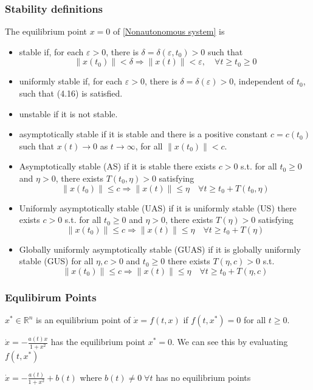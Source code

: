 \documentclass{article}
\begin{document}
\subsubsection{Stability definitions}
The equilibrium point $x=0$ of \ref{Nonautonomous system} is
\begin{itemize}
	\item stable if, for each $\varepsilon>0$, there is $\delta=\delta\left(\varepsilon,
		      t_0\right)>0$ such that $$ \left\|x\left(t_0\right)\right\|<\delta
		      \Rightarrow\|x(t)\|<\varepsilon, \quad \forall t \geq t_0 \geq 0 $$
	\item uniformly stable if, for each $\varepsilon>0$, there is
	      $\delta=\delta(\varepsilon)>0$, independent of $t_0$, such that (4.16) is
	      satisfied.
	\item unstable if it is not stable.
	\item asymptotically stable if it is stable and there is a positive constant
	      $c=c\left(t_0\right)$ such that $x(t) \rightarrow 0$ as $t \rightarrow \infty$,
	      for all $\left\|x\left(t_0\right)\right\|<c$.
	\item Asymptotically stable (AS) if \subitem it is stable \subitem there exists $c>0$
	      s.t. for all $t_0 \geq 0$ and $\eta>0$, there exists $T\left(t_0,
		      \eta\right)>0$ satisfying $$ \left\|x\left(t_0\right)\right\| \leq c
		      \Longrightarrow\|x(t)\| \leq \eta \quad \forall t \geq t_0+T\left(t_0,
		      \eta\right) $$
	\item Uniformly asymptotically stable (UAS) if \subitem it is uniformly stable (US)
	      \subitem there exists $c>0$ s.t. for all $t_0 \geq 0$ and $\eta>0$, there
	      exists $T(\eta)>0$ satisfying $$ \left\|x\left(t_0\right)\right\| \leq c
		      \Longrightarrow\|x(t)\| \leq \eta \quad \forall t \geq t_0+T(\eta) $$

	\item Globally uniformly asymptotically stable (GUAS) if \subitem it is globally
	      uniformly stable (GUS) \subitem for all $\eta, c>0$ and $t_0 \geq 0$ there
	      exists $T(\eta, c)>0$ s.t. $$ \left\|x\left(t_0\right)\right\| \leq c
		      \Longrightarrow\|x(t)\| \leq \eta \quad \forall t \geq t_0+T(\eta, c) $$
\end{itemize}
\subsubsection{Equlibirum Points}
$x^* \in \mathbb{R}^n$ is an equilibrium point of $\dot x = f(t,x)$ if $f(t,x^*) = 0$ for all $t \geq 0$.
\begin{frm-ex}
\item $\dot x = -\frac{a(t)x}{1+x^2}$ has the equilibrium point $x^* = 0$. We can see this by evaluating $f(t,x^*)$
\item $\dot x = -\frac{a(t)}{1+x^2}+b(t)$ where $b(t) \neq 0 \; \forall t$ has no equilibrium points
\end{frm-ex}
\end{document}
